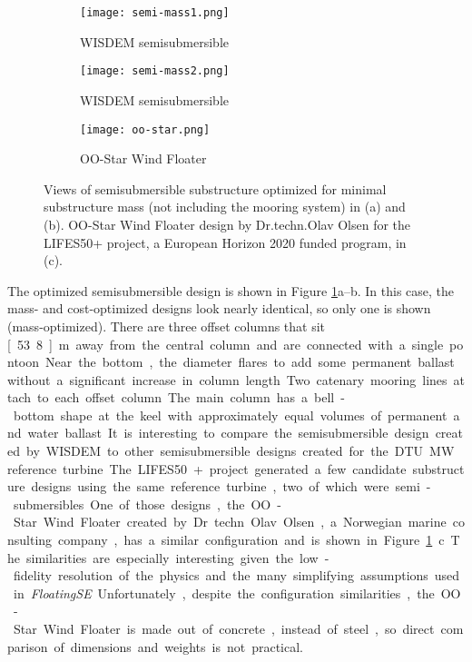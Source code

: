 \begin{figure}[htb]
  \begin{subfigure}[b]{0.29\linewidth}
    \centering \texttt{[image: semi-mass1.png]}
    \caption{WISDEM semisubmersible}
  \end{subfigure}
  \begin{subfigure}[b]{0.40\linewidth}
    \centering \texttt{[image: semi-mass2.png]}
    \caption{WISDEM semisubmersible}
  \end{subfigure}
  \begin{subfigure}[b]{0.29\linewidth}
    \centering \texttt{[image: oo-star.png]}
    \caption{OO-Star Wind Floater}
  \end{subfigure}
  \caption{Views of semisubmersible substructure optimized for minimal
    substructure mass (not including the mooring system) in (a) and (b).
    OO-Star Wind Floater design by Dr.techn.Olav Olsen for the LIFES50+
    project, a European Horizon 2020 funded program, in (c).}
  \label{fig:semi-mass}
\end{figure}

The optimized semisubmersible design is shown in Figure
\ref{fig:semi-mass}a--b.  In this case, the mass- and cost-optimized
designs look nearly identical, so only one is shown (mass-optimized).
There are three offset columns that sit \unit[53.8]{m} away from the
central column and are connected with a single pontoon.  Near
the bottom, the diameter flares to add some permanent ballast without a
significant increase in column length.  Two catenary mooring lines
attach to each offset column.  The main column has a bell-bottom shape
at the keel with approximately equal volumes of permanent and water
ballast.

It is interesting to compare the semisubmersible design created by
WISDEM to other semisubmersible designs created for the DTU
\unit[10]{MW} reference turbine.  The LIFES50+ project generated a few
candidate substructure designs using the same reference turbine, two of
which were semi-submersibles.  One of those designs, the OO-Star Wind
Floater created by Dr.techn.Olav Olsen, a Norwegian marine consulting
company, has a similar configuration and is shown in Figure
\ref{fig:semi-mass}c. The similarities are especially interesting given the
low-fidelity resolution of the physics and the many simplifying
assumptions used in \textit{FloatingSE}. Unfortunately, despite the
configuration similarities, the OO-Star Wind Floater is made out of
concrete, instead of steel, so direct comparison of dimensions and
weights is not practical.

